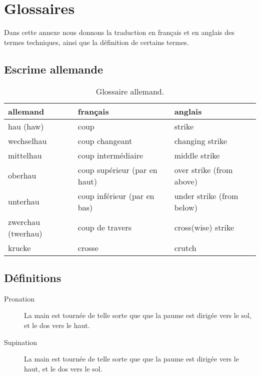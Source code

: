 \chapter{Glossaires}


Dans cette annexe nous donnons la traduction en français et en anglais des termes techniques, ainsi que la définition de certains termes.





\section{Escrime allemande}


\begin{table}[h]
	\centering
	\begin{tabular}{lll}
		allemand &
			français &
			anglais
			\\
		\hline
		hau (haw) &
			coup &
			strike
			\\
		wechselhau &
			coup changeant &
			changing strike
			\\
		mittelhau &
			coup intermédiaire &
			middle strike
			\\
		oberhau &
			coup supérieur (par en haut) &
			over strike (from above)
			\\
		unterhau &
			coup inférieur (par en bas) &
			under strike (from below)
			\\
		zwerchau (twerhau) &
			coup de travers &
			cross(wise) strike
			\\
		krucke &
			crosse &
			crutch
	\end{tabular}
	\caption{Glossaire allemand.}
	\label{app:tab:glossaire-allemand}
\end{table}


\section{Définitions}


\begin{description}
	\item[Pronation] La main est tournée de telle sorte que que la paume est dirigée vers le sol, et le dos vers le haut.
	
	\item[Supination] La main est tournée de telle sorte que que la paume est dirigée vers le haut, et le dos vers le sol.
\end{description}

